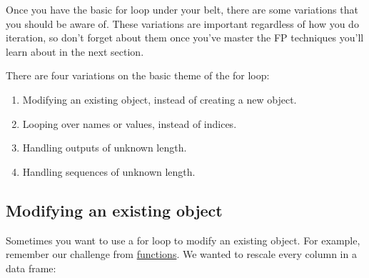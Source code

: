 \documentclass[]{book}
\newenvironment{Shaded}{\begin{snugshade}}{\end{snugshade}}
\newcommand{\KeywordTok}[1]{\textcolor[rgb]{0.13,0.29,0.53}{\textbf{{#1}}}}
\newcommand{\DataTypeTok}[1]{\textcolor[rgb]{0.13,0.29,0.53}{{#1}}}
\newcommand{\DecValTok}[1]{\textcolor[rgb]{0.00,0.00,0.81}{{#1}}}
\newcommand{\StringTok}[1]{\textcolor[rgb]{0.31,0.60,0.02}{{#1}}}
\newcommand{\OtherTok}[1]{\textcolor[rgb]{0.56,0.35,0.01}{{#1}}}
\newcommand{\NormalTok}[1]{{#1}}
\providecommand{\tightlist}{%
  \setlength{\itemsep}{0pt}\setlength{\parskip}{0pt}}
\begin{document}
Once you have the basic for loop under your belt, there are some
variations that you should be aware of. These variations are important
regardless of how you do iteration, so don't forget about them once
you've master the FP techniques you'll learn about in the next section.

There are four variations on the basic theme of the for loop:

\begin{enumerate}
\def\labelenumi{\arabic{enumi}.}
\tightlist
\item
  Modifying an existing object, instead of creating a new object.
\item
  Looping over names or values, instead of indices.
\item
  Handling outputs of unknown length.
\item
  Handling sequences of unknown length.
\end{enumerate}

\subsection{Modifying an existing
object}\label{modifying-an-existing-object}

Sometimes you want to use a for loop to modify an existing object. For
example, remember our challenge from
\protect\hyperlink{functions}{functions}. We wanted to rescale every
column in a data frame:

\begin{Shaded}
\end{Shaded}
\end{document}
